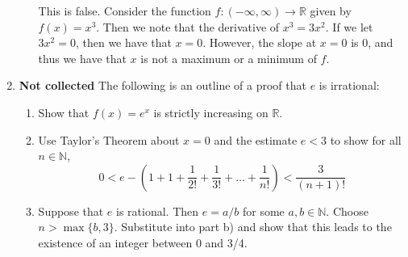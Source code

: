 \documentclass[12pt,letterpaper]{article}
\newcommand{\R}{\mathbb{R}}
\newcommand{\N}{\mathbb{N}}
\theoremstyle{case}
\theoremstyle{definition}
\begin{document}
\begin{enumerate}
\begin{enumerate}
			This is false. Consider the function $f:(-\infty,\infty) \to \R$ given by $f(x)=x^3$. Then we note that the derivative of $x^3 = 3x^2$. If we let $3x^2=0$, then we have that $x=0$. However, the slope at $x=0$ is $0$, and thus we have that $x$ is not a maximum or a minimum of $f$.\\
		\end{enumerate}
		\item \textbf{Not collected} The following is an outline of a proof that $e$ is irrational:
		\begin{enumerate}
			\item Show that $f(x)=e^x$ is strictly increasing on $\R$.
			
			\item Use Taylor's Theorem about $x=0$ and the estimate $e < 3$ to show for all $n \in \N$,
			\[0<e-\left(1+1+\frac{1}{2!}+\frac{1}{3!}+ \dots + \frac{1}{n!}\right)< \frac{3}{(n+1)!}\]
			
			\item Suppose that $e$ is rational. Then $e=a/b$ for some $a,b \in \N$. Choose $n > \max \{b,3\}$. Substitute into part b) and show that this leads to the existence of an integer between 0 and 3/4.
		\end{enumerate}
	\end{enumerate}
\end{document}
